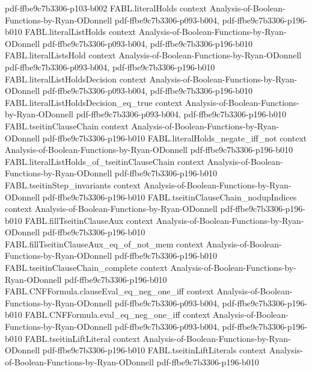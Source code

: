 \begin{theorem}
  {pdf-ffbe9c7b3306-p103-b002}
\proofstep
  {FABL.literalHolds}
  {context}
  {Analysis-of-Boolean-Functions-by-Ryan-ODonnell}
  {pdf-ffbe9c7b3306-p093-b004,
    pdf-ffbe9c7b3306-p196-b010}
\proofstep
  {FABL.literalListHolds}
  {context}
  {Analysis-of-Boolean-Functions-by-Ryan-ODonnell}
  {pdf-ffbe9c7b3306-p093-b004,
    pdf-ffbe9c7b3306-p196-b010}
\proofstep
  {FABL.literalListsHold}
  {context}
  {Analysis-of-Boolean-Functions-by-Ryan-ODonnell}
  {pdf-ffbe9c7b3306-p093-b004,
    pdf-ffbe9c7b3306-p196-b010}
\proofstep
  {FABL.literalListHoldsDecision}
  {context}
  {Analysis-of-Boolean-Functions-by-Ryan-ODonnell}
  {pdf-ffbe9c7b3306-p093-b004,
    pdf-ffbe9c7b3306-p196-b010}
\proofstep
  {FABL.literalListHoldsDecision_eq_true}
  {context}
  {Analysis-of-Boolean-Functions-by-Ryan-ODonnell}
  {pdf-ffbe9c7b3306-p093-b004,
    pdf-ffbe9c7b3306-p196-b010}
\proofstep
  {FABL.tseitinClauseChain}
  {context}
  {Analysis-of-Boolean-Functions-by-Ryan-ODonnell}
  {pdf-ffbe9c7b3306-p196-b010}
\proofstep
  {FABL.literalHolds_negate_iff_not}
  {context}
  {Analysis-of-Boolean-Functions-by-Ryan-ODonnell}
  {pdf-ffbe9c7b3306-p196-b010}
\proofstep
  {FABL.literalListHolds_of_tseitinClauseChain}
  {context}
  {Analysis-of-Boolean-Functions-by-Ryan-ODonnell}
  {pdf-ffbe9c7b3306-p196-b010}
\proofstep
  {FABL.tseitinStep_invariants}
  {context}
  {Analysis-of-Boolean-Functions-by-Ryan-ODonnell}
  {pdf-ffbe9c7b3306-p196-b010}
\proofstep
  {FABL.tseitinClauseChain_nodupIndices}
  {context}
  {Analysis-of-Boolean-Functions-by-Ryan-ODonnell}
  {pdf-ffbe9c7b3306-p196-b010}
\proofstep
  {FABL.fillTseitinClauseAux}
  {context}
  {Analysis-of-Boolean-Functions-by-Ryan-ODonnell}
  {pdf-ffbe9c7b3306-p196-b010}
\proofstep
  {FABL.fillTseitinClauseAux_eq_of_not_mem}
  {context}
  {Analysis-of-Boolean-Functions-by-Ryan-ODonnell}
  {pdf-ffbe9c7b3306-p196-b010}
\proofstep
  {FABL.tseitinClauseChain_complete}
  {context}
  {Analysis-of-Boolean-Functions-by-Ryan-ODonnell}
  {pdf-ffbe9c7b3306-p196-b010}
\proofstep
  {FABL.CNFFormula.clauseEval_eq_neg_one_iff}
  {context}
  {Analysis-of-Boolean-Functions-by-Ryan-ODonnell}
  {pdf-ffbe9c7b3306-p093-b004,
    pdf-ffbe9c7b3306-p196-b010}
\proofstep
  {FABL.CNFFormula.eval_eq_neg_one_iff}
  {context}
  {Analysis-of-Boolean-Functions-by-Ryan-ODonnell}
  {pdf-ffbe9c7b3306-p093-b004,
    pdf-ffbe9c7b3306-p196-b010}
\proofstep
  {FABL.tseitinLiftLiteral}
  {context}
  {Analysis-of-Boolean-Functions-by-Ryan-ODonnell}
  {pdf-ffbe9c7b3306-p196-b010}
\proofstep
  {FABL.tseitinLiftLiterals}
  {context}
  {Analysis-of-Boolean-Functions-by-Ryan-ODonnell}
  {pdf-ffbe9c7b3306-p196-b010}

\end{theorem}
